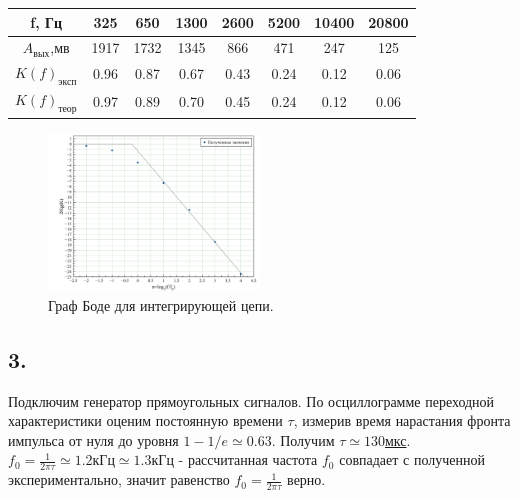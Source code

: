 \documentclass[a4paper, 12pt, twoside]{article}
\begin{document}
\begin{table}[H]
	\centering
	
	\label{my-label}
	\begin{tabular}{|c|c|c|c|c|c|c|c|}
		\hline
		f, Гц                & 325  & 650  & 1300 & 2600 & 5200 & 10400 & 20800 \\ \hline
		$A_{\text{вых}}$,мв  & 1917 & 1732 & 1345 & 866  & 471  & 247   & 125   \\ \hline
		$K(f)_{\text{эксп}}$ & 0.96 & 0.87 & 0.67 & 0.43 & 0.24 & 0.12  & 0.06  \\ \hline
		$K(f)_{\text{теор}}$ & 0.97 & 0.89 & 0.70  & 0.45 & 0.24 & 0.12  & 0.06  \\ \hline
	\end{tabular}
\end{table}

\begin{figure}[H]
	\centering
	\includegraphics[width = 0.5\textwidth]{bodeint}
	\caption{Граф Боде для интегрирующей цепи.}
\end{figure}

\subsection*{3.}
Подключим генератор прямоугольных сигналов. По осциллограмме переходной характеристики оценим постоянную времени $\tau$, измерив время нарастания фронта импульса от нуля до уровня $1-1/e \simeq 0.63$. Получим \underline{$\tau \simeq 130$мкс}. $f_0 = \frac{1}{2\pi \tau} \simeq 1.2\text{кГц} \simeq 1.3 \text{кГц}$ - рассчитанная частота $f_0$ совпадает с полученной экспериментально, значит равенство $f_0 = \frac{1}{2\pi \tau}$ верно.
\end{document}
